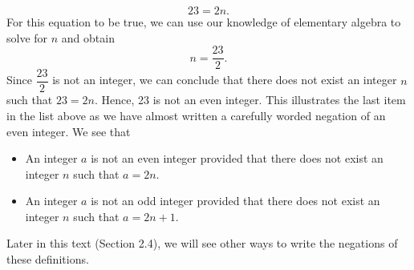 \documentclass[11pt]{article}
\begin{document}
\[
23 = 2n.
\]
For this equation to be true, we can use our knowledge of elementary algebra to solve for $n$ and obtain
\[
n = \dfrac{23}{2}.
\]
Since $\dfrac{23}{2}$ is not an integer, we can conclude that there does not exist an integer $n$ such that $23 = 2n$.  Hence, 23 is not an even integer.  This illustrates the  last item in the list above as we have almost written a carefully worded negation of an even integer.  We see that
\begin{itemize}
  \item An integer $a$ is not an even integer provided that there does not exist an integer $n$ such that $a = 2n$.
  \item An integer $a$ is not an odd integer provided that there does not exist an integer $n$ such that $a = 2n + 1$.
\end{itemize}
Later in this text (Section 2.4), we will see other ways to write the negations of these definitions.
%
%
\hbreak
\end{document}
